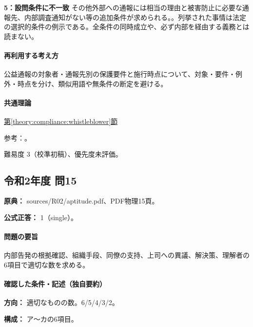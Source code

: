 \noindent\textbf{5：設問条件に不一致} その他外部への通報には相当の理由と被害防止に必要な通報先、内部調査通知がない等の追加条件が求められる。。列挙された事情は法定の選択的条件の例示である。全条件の同時成立や、必ず内部を経由する義務とは読まない。\par

\paragraph{再利用する考え方} 公益通報の対象者・通報先別の保護要件と施行時点について、対象・要件・例外・時点を分け、類似用語や無条件の断定を避ける。

\paragraph{共通理論} \hyperref[theory:compliance:whistleblower]{第\ref*{theory:compliance:whistleblower}節}

\par 参考：\cite{caa_handbook_pre2022,caa_report_current,caa_amend2020,caa_schedule2026}。

\par 難易度 3（校準初稿）、優先度未評価。

\subsection{令和2年度 問15}
\label{q:r02-reg-apt-15}

\noindent\textbf{原典：} sources/R02/aptitude.pdf、PDF物理15頁。

\textbf{公式正答：} 1（single）。

\paragraph{問題の要旨} 内部告発の根拠確認、組織手段、同僚の支持、上司への異議、解決策、理解者の6項目で適切な数を求める。

\paragraph{確認した条件・記述（独自要約）}\mbox{}\par

\noindent\textbf{方向：} 適切なものの数。6/5/4/3/2。\par

\noindent\textbf{構成：} ア〜カの6項目。\par

